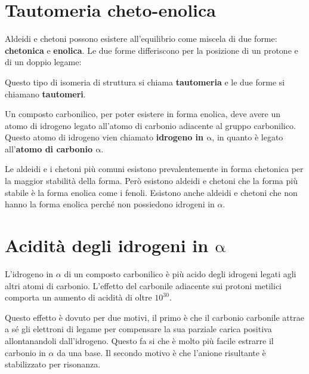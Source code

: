 \section{Tautomeria cheto-enolica}\label{sec:tautomeria}
Aldeidi e chetoni possono esistere all'equilibrio come miscela di due forme: \textbf{chetonica} e \textbf{enolica}. Le due forme differiscono per la posizione di un protone e di un doppio legame:

\begin{reaction}
	\arrow{<=>}
\end{reaction}

Questo tipo di isomeria di struttura si chiama \textbf{tautomeria} e le due forme si chiamano \textbf{tautomeri}.

Un composto carbonilico, per poter esistere in forma enolica, deve avere un atomo di idrogeno legato all'atomo di carbonio adiacente al gruppo carbonilico. Questo atomo di idrogeno vien chiamato \textbf{idrogeno in \(\bm{\mathrm{\alpha}}\)}, in quanto è legato all'\textbf{atomo di carbonio \(\bm{\mathrm{\alpha}}\)}.

Le aldeidi e i chetoni più comuni esistono prevalentemente in forma chetonica per la maggior stabilità della forma. Però esistono aldeidi e chetoni che la forma più stabile è la forma enolica come i fenoli. Esistono anche aldeidi e chetoni che non hanno la forma enolica perché non possiedono idrogeni in \(\alpha\).


\section[Acidità degli idrogeni in \texorpdfstring{\(\alpha\)}{α}]{Acidità degli idrogeni in \texorpdfstring{\(\bm{\mathrm{\alpha}}\)}{α}}
L'idrogeno in \(\alpha\) di un composto carbonilico è più acido degli idrogeni legati agli altri atomi di carbonio. L'effetto del carbonile adiacente sui protoni metilici comporta un aumento di acidità di oltre \(10^{30}\).

Questo effetto è dovuto per due motivi, il primo è che il carbonio carbonile attrae a sé gli elettroni di legame per compensare la sua parziale carica positiva allontanandoli dall'idrogeno. Questo fa si che è molto più facile estrarre il carbonio in \(\alpha\) da una base. Il secondo motivo è che l'anione risultante è stabilizzato per risonanza.

